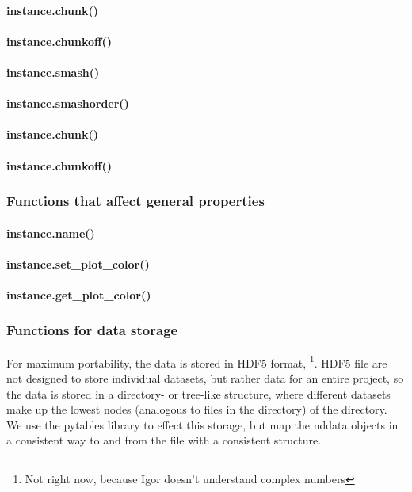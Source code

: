 \paragraph{instance.chunk()}
\paragraph{instance.chunkoff()}
\paragraph{instance.smash()}
\paragraph{instance.smashorder()}
\paragraph{instance.chunk()}
\paragraph{instance.chunkoff()}
\subsubsection{Functions that affect general properties}
\paragraph{instance.name()}
\paragraph{instance.set\_plot\_color()}
\paragraph{instance.get\_plot\_color()}
\subsubsection{Functions for data storage}
For maximum portability, the data is stored in HDF5 format, \footnote{Not right now, because Igor doesn't understand complex numbers}.
HDF5 file are not designed to store individual datasets, but rather data for an entire project, so the data is stored in a directory- or tree-like structure, where different datasets make up the lowest nodes (analogous to files in the directory) of the directory. 
We use the pytables library to effect this storage, but map the nddata objects in a consistent way to and from the file with a consistent structure.
